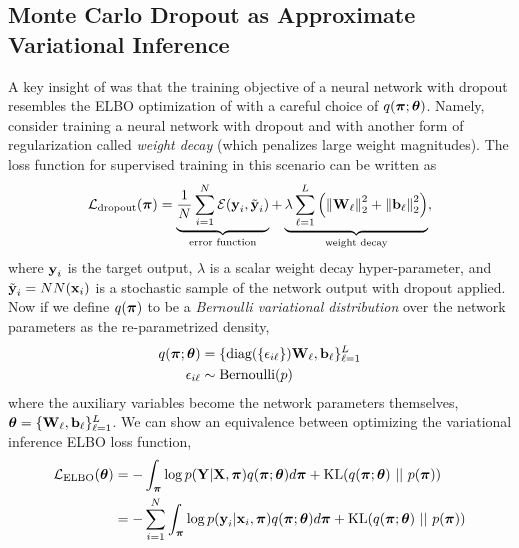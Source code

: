 \subsection{Monte Carlo Dropout as Approximate Variational Inference}
A key insight of \cite{Gal2016UncertaintyThesis, Gal2016-ny} was that the training objective of a neural network with dropout resembles the ELBO optimization of  with a careful choice of $q(\boldsymbol{\mathbf{\pi}}; \boldsymbol{\mathbf{\theta}})$.
Namely, consider training a neural network with dropout and with another form of regularization called \textit{weight decay} (which penalizes large weight magnitudes). The loss function for supervised training in this scenario can be written as
\begin{equation}
\label{eq:sun_bcnn_dropout_obj}
\mathcal{L}_{\text{dropout}}(\boldsymbol{\mathbf{\pi}}) = \underbrace{\frac{1}{N} \sum_{i=1}^N \mathcal{E}(\boldsymbol{\mathbf{y}}_i, \tilde{\boldsymbol{\mathbf{y}}}_i)}_{\text{error function}} + \underbrace{\lambda \sum_{\ell=1}^L	\left( \left\Vert\boldsymbol{\mathbf{W}}_\ell\right\Vert_2^2 +  \left\Vert\boldsymbol{\mathbf{b}}_\ell\right\Vert_2^2\right)}_{\text{weight decay}},
\end{equation}
where $\boldsymbol{\mathbf{y}}_i$ is the target output, $\lambda$ is a scalar weight decay hyper-parameter, and $\tilde{\boldsymbol{\mathbf{y}}}_i = NN(\boldsymbol{\mathbf{x}}_i)$ is a stochastic sample of the network output with dropout applied. Now if we define $q(\boldsymbol{\mathbf{\pi}})$ to be a \textit{Bernoulli variational distribution}  over the network parameters as the re-parametrized density,
\begin{align}
	q(\boldsymbol{\mathbf{\pi}}; \boldsymbol{\mathbf{\theta}}) &= \{\text{diag} (\{ \epsilon_{i\ell} \}) \boldsymbol{\mathbf{W}}_\ell, \boldsymbol{\mathbf{b}}_\ell\}_{\ell=1}^L \\
	\epsilon_{i\ell} &\sim \text{Bernoulli}(p) 
\end{align}
where the auxiliary variables become the network parameters themselves, $\boldsymbol{\mathbf{\theta}} = \{\boldsymbol{\mathbf{W}}_\ell, \boldsymbol{\mathbf{b}}_\ell\}_{\ell=1}^L$. We can show an equivalence between optimizing the variational inference ELBO loss function,
\begin{align}
\mathcal{L}_{\text{ELBO}}(\boldsymbol{\mathbf{\theta}}) &= -\int_{\boldsymbol{\mathbf{\pi}}}  \log p(\boldsymbol{\mathbf{Y}} | \boldsymbol{\mathbf{X}}, \boldsymbol{\mathbf{\pi}})  q(\boldsymbol{\mathbf{\pi}}; \boldsymbol{\mathbf{\theta}}) d\boldsymbol{\mathbf{\pi}} +  \text{KL}(q(\boldsymbol{\mathbf{\pi}}; \boldsymbol{\mathbf{\theta}}) ~ || ~ p(\boldsymbol{\mathbf{\pi}}))\\
&= - \sum_{i=1}^N \int_{\boldsymbol{\mathbf{\pi}}}  \log p(\boldsymbol{\mathbf{y}}_i | \boldsymbol{\mathbf{x}}_i, \boldsymbol{\mathbf{\pi}})  q(\boldsymbol{\mathbf{\pi}}; \boldsymbol{\mathbf{\theta}}) d\boldsymbol{\mathbf{\pi}} + \text{KL}(q(\boldsymbol{\mathbf{\pi}}; \boldsymbol{\mathbf{\theta}}) ~ || ~ p(\boldsymbol{\mathbf{\pi}}))
\end{align}
